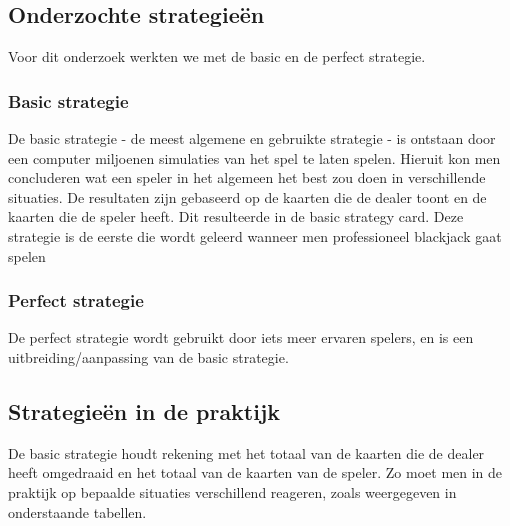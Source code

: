 \documentclass[conference]{IEEEtran}
\begin{document}
\subsection{Onderzochte strategie\"{e}n}
Voor dit onderzoek werkten we met de basic en de perfect strategie.
\subsubsection{Basic strategie}
De basic strategie - de meest algemene en gebruikte strategie - is ontstaan door een computer miljoenen simulaties van het spel te laten spelen. Hieruit kon men concluderen wat een speler in het algemeen het best zou doen in verschillende situaties. De resultaten zijn gebaseerd op de kaarten die de dealer toont en de kaarten die de speler heeft. Dit resulteerde in de basic strategy card. Deze strategie is de eerste die wordt geleerd wanneer men professioneel blackjack gaat spelen

\subsubsection{Perfect strategie}
De perfect strategie wordt gebruikt door iets meer ervaren spelers, en is een uitbreiding/aanpassing van de basic strategie.

\subsection{Strategie\"{e}n in de praktijk}
De basic strategie houdt rekening met het totaal van de kaarten die de dealer heeft omgedraaid en het totaal van de kaarten van de speler. Zo moet men in de praktijk op bepaalde situaties verschillend reageren, zoals weergegeven in onderstaande tabellen.
\end{document}
